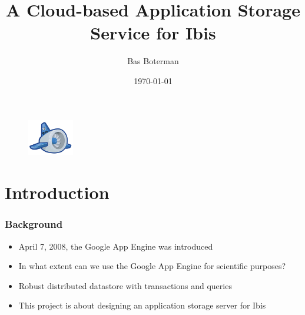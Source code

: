 \documentclass{beamer}
\title{A Cloud-based Application Storage Service \newline for Ibis}
\author{Bas Boterman}
\date{\today}
\begin{document}
\frame
{
	\titlepage
	\begin{figure}[h]
	\begin{center}
	\includegraphics[width=2cm]{msc_logo.png} 
	\end{center}
	\end{figure}
}

\section[Outline]{}
\frame
{
	\tableofcontents
}

\section{Introduction}
\frame
{
	\frametitle{Background}
	\begin{itemize}
    	\item <1->April 7, 2008, the Google App Engine was introduced
    	\item <2->In what extent can we use the Google App Engine for scientific
      		purposes?
      	\item <3->Robust distributed datastore with transactions and queries
    	\item <4->This project is about designing an application storage server
    		for Ibis
    \end{itemize}
}



\end{document}
